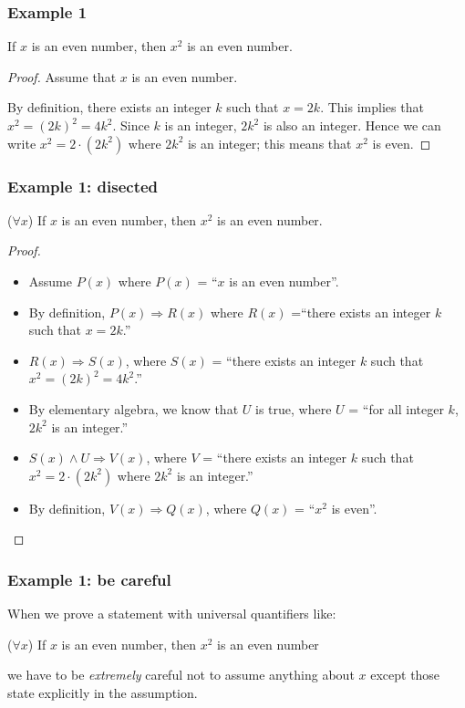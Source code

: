 \begin{frame}\frametitle{Example 1}
  \begin{theorem}
    If $x$ is an even number, then $x^2$ is an even number.
  \end{theorem} \pause
  \begin{proof}
    Assume that $x$ is an even number. \pause

    By definition, there exists an integer $k$ such that
    $x=2k$. \pause This implies that $x^2 = (2k)^2 = 4k^2$.  \pause
    Since $k$ is an integer, $2k^2$ is also an integer.  Hence we can
    write $x^2 = 2\cdot (2k^2)$ where $2k^2$ is an integer; this means
    that $x^2$ is even.
  \end{proof}
\end{frame}

\begin{frame}\frametitle{Example 1: disected}
  \begin{theorem}
    ($\forall x$) If $x$ is an even number, then $x^2$ is an even
    number.
  \end{theorem} \pause
  \begin{proof}
    {\small
      \begin{itemize}
      \item Assume $P(x)$ where $P(x)$ = ``$x$ is an even
        number''. \pause
      \item By definition, $P(x)\Rightarrow R(x)$ where $R(x)$ =``there
        exists an integer $k$ such that $x=2k$.'' \pause
      \item $R(x)\Rightarrow S(x)$, where $S(x)$ = ``there exists an
        integer $k$ such that $x^2 = (2k)^2 = 4k^2$.''  \pause
      \item By elementary algebra, we know that $U$ is true, where $U$ =
        ``for all integer $k$, $2k^2$ is an integer.''  \pause
      \item $S(x)\wedge U\Rightarrow V(x)$, where $V$ = ``there exists
        an integer $k$ such that $x^2 = 2\cdot (2k^2)$ where $2k^2$ is
        an integer.'' \pause
      \item By definition, $V(x)\Rightarrow Q(x)$, where $Q(x)$ = ``$x^2$
        is even''.
      \end{itemize}
    }
  \end{proof}
\end{frame}

\begin{frame}\frametitle{Example 1: be careful}
  When we prove a statement with universal quantifiers like:

  \begin{tcolorbox}
    ($\forall x$) If $x$ is an even number, then $x^2$ is an even
    number
  \end{tcolorbox}

  we have to be {\em extremely} careful not to assume anything about
  $x$ except those state explicitly in the assumption.
\end{frame}

